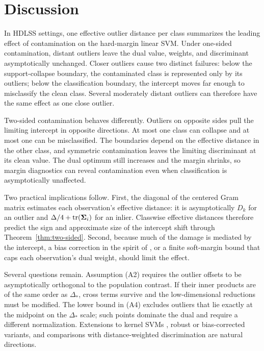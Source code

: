 \section{Discussion}
In HDLSS settings, one effective outlier distance per class summarizes the leading effect of contamination on the hard-margin linear SVM. Under one-sided contamination, distant outliers leave the dual value, weights, and discriminant asymptotically unchanged. Closer outliers cause two distinct failures: below the support-collapse boundary, the contaminated class is represented only by its outliers; below the classification boundary, the intercept moves far enough to misclassify the clean class. Several moderately distant outliers can therefore have the same effect as one close outlier.

Two-sided contamination behaves differently. Outliers on opposite sides pull the limiting intercept in opposite directions. At most one class can collapse and at most one can be misclassified. The boundaries depend on the effective distance in the other class, and symmetric contamination leaves the limiting discriminant at its clean value. The dual optimum still increases and the margin shrinks, so margin diagnostics can reveal contamination even when classification is asymptotically unaffected.

Two practical implications follow. First, the diagonal of the centered Gram matrix estimates each observation's effective distance: it is asymptotically $D_k$ for an outlier and $\Delta/4+\operatorname{tr}(\boldsymbol\Sigma_i)$ for an inlier. Classwise effective distances therefore predict the sign and approximate size of the intercept shift through Theorem~\ref{thm:two-sided}. Second, because much of the damage is mediated by the intercept, a bias correction in the spirit of \citet{nakayama2017}, or a finite soft-margin bound that caps each observation's dual weight, should limit the effect.

Several questions remain. Assumption (A2) requires the outlier offsets to be asymptotically orthogonal to the population contrast. If their inner products are of the same order as $\Delta_*$, cross terms survive and the low-dimensional reductions must be modified. The lower bound in (A4) excludes outliers that lie exactly at the midpoint on the $\Delta_*$ scale; such points dominate the dual and require a different normalization. Extensions to kernel SVMs \citep{nakayama2020}, robust or bias-corrected variants, and comparisons with distance-weighted discrimination \citep{marron2007} are natural directions.
